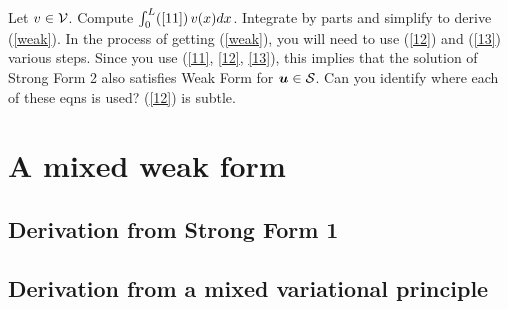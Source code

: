 \documentclass[12pt,american]{article}
\def \u{\mbox{\boldmath{$u$}}}
\def \cS{{\cal{S}}}
\def \cV{{\cal{V}}}
\begin{document}
\begin{tcolorbox}[title= Exercise: Derive the weak form from the strong form] 
Let $v \in \cV$.  Compute $\int_0^L (\ref{11})\,  v(x) dx$.  
Integrate by parts and simplify to derive (\ref{weak}).  
In the process of getting (\ref{weak}), you will need to use (\ref{12}) and (\ref{13}) 
various steps.  Since you use (\ref{11}, \ref{12}, \ref{13}), this implies that the 
solution of Strong Form 2 also satisfies Weak Form for $\u \in \cS$.  
Can you identify where each of these eqns is used? 
(\ref{12}) is subtle.
\end{tcolorbox}




\section{A mixed weak form}

\subsection{Derivation from Strong Form 1}

\subsection{Derivation from a mixed variational principle}
\end{document}
